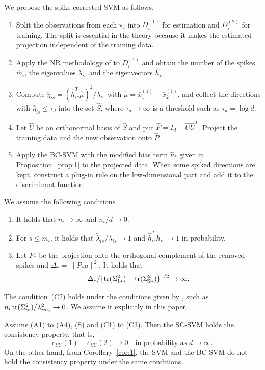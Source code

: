 \begin{definition}[SC-SVM]
\label{def:2}
We propose the spike-corrected SVM as follows.
\begin{enumerate}
\item Split the observations from each $\pi_i$ into $D_i^{(1)}$ for estimation and
$D_i^{(2)}$ for training. The split is essential in the theory because it makes
the estimated projection independent of the training data.
\item Apply the NR methodology of \citet{yata2012} to $D_i^{(1)}$ and obtain the
number of the spikes $\hat m_i$, the eigenvalues $\tilde\lambda_{is}$ and the
eigenvectors $\hat h_{is}$.
\item Compute $\hat\eta_{is}=(\hat h_{is}^T\hat\mu)^2/\tilde\lambda_{is}$ with
$\hat\mu=\bar x_1^{(1)}-\bar x_2^{(1)}$, and collect the directions with
$\hat\eta_{is}\le\tau_d$ into the set $\hat S$, where $\tau_d\to\infty$ is a
threshold such as $\tau_d=\log d$.
\item Let $\hat U$ be an orthonormal basis of $\hat S$ and put
$\hat P=I_d-\hat U\hat U^T$. Project the training data and the new observation
onto $\hat P$.
\item Apply the BC-SVM with the modified bias term $\hat\kappa_*$ given in
Proposition~\ref{prop:1} to the projected data. When some spiked directions are
kept, construct a plug-in rule on the low-dimensional part and add it to the
discriminant function.
\end{enumerate}
\end{definition}

We assume the following conditions.

\begin{enumerate}[label=(C\arabic*),leftmargin=*]
\item It holds that $n_i\to\infty$ and $n_i/d\to 0$.
\item For $s\le m_i$, it holds that $\tilde\lambda_{is}/\lambda_{is}\to 1$ and
$\hat h_{is}^Th_{is}\to 1$ in probability.
\item Let $P_*$ be the projection onto the orthogonal complement of the removed
spikes and $\Delta_*=\|P_*\mu\|^2$. It holds that
\[
\Delta_*/\{\operatorname{tr}(\Sigma_{1*}^2)+\operatorname{tr}(\Sigma_{2*}^2)\}^{1/2}\to\infty.
\]
\end{enumerate}

The condition~(C2) holds under the conditions given by \citet{yata2012}, such as
$n_i\operatorname{tr}(\Sigma_{i*}^2)/\lambda_{im_i}^2\to 0$. We assume it explicitly in this
paper.

\begin{theorem}
\label{thm:5}
Assume \textup{(A1)} to \textup{(A4)}, \textup{(S)} and \textup{(C1)} to
\textup{(C3)}. Then the SC-SVM holds the consistency property, that is,
\[
e_{SC}(1)+e_{SC}(2)\longrightarrow 0
\quad\text{in probability as }d\to\infty.
\]
On the other hand, from Corollary~\ref{cor:1}, the SVM and the BC-SVM do not hold
the consistency property under the same conditions.
\end{theorem}

